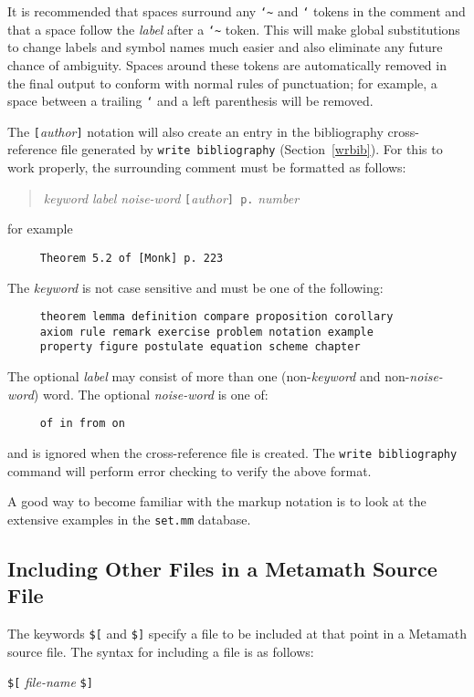 It is recommended that spaces surround any \texttt{\char`\~} and \texttt{`} tokens
in the comment and that a space follow the {\em label} after a \texttt{\char`\~} token.
This will make global substitutions to change labels and symbol names much easier
and also eliminate any future chance of ambiguity.  Spaces
around these tokens are automatically removed in
the final output to conform with normal rules of punctuation; for example, a space
between a trailing \texttt{`} and a left parenthesis will be removed.

The \texttt{[}{\em author}\texttt{]} notation will also create an entry in
the bibliography cross-reference file generated by \texttt{write
bibliography} (Section~\ref{wrbib}).  For this to work properly, the
surrounding comment must be formatted as follows:
\begin{quote}
    {\em keyword} {\em label} {\em noise-word}
     \texttt{[}{\em author}\texttt{] p.} {\em number}
\end{quote}
for example
\begin{verbatim}
     Theorem 5.2 of [Monk] p. 223
\end{verbatim}
The {\em keyword} is not case sensitive and must be one of the following:
\begin{verbatim}
     theorem lemma definition compare proposition corollary
     axiom rule remark exercise problem notation example
     property figure postulate equation scheme chapter
\end{verbatim}
The optional {\em label} may consist of more than one
(non-{\em keyword} and non-{\em noise-word}) word.
The optional {\em noise-word} is one of:
\begin{verbatim}
     of in from on
\end{verbatim}
and is  ignored when the cross-reference file is created.  The
\texttt{write
biblio\-graphy} command will perform error checking to verify the
above format.

A good way to become familiar with the markup notation is to look at
the extensive examples in the \texttt{set.mm} database.


\subsection{Including Other Files in a Metamath Source File} \label{include}

The keywords \texttt{\$[} and \texttt{\$]} specify a file to be
included at that point in a
Metamath source file.  The syntax for
including a file is as follows:
\begin{center}
\texttt{\$[} {\em file-name} \texttt{\$]}
\end{center}

